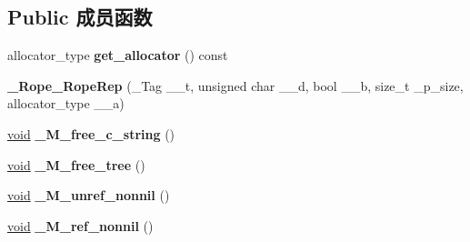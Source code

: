 \subsection*{Public 成员函数}
\begin{DoxyCompactItemize}
\item 
\mbox{\label{struct___rope___rope_rep_a7c8df0d1709c188805f4245326d29368}} 
allocator\+\_\+type {\bfseries get\+\_\+allocator} () const
\item 
\mbox{\label{struct___rope___rope_rep_a4087fed54c89f2140bf807587d797a35}} 
{\bfseries \+\_\+\+Rope\+\_\+\+Rope\+Rep} (\+\_\+\+Tag \+\_\+\+\_\+t, unsigned char \+\_\+\+\_\+d, bool \+\_\+\+\_\+b, size\+\_\+t \+\_\+p\+\_\+size, allocator\+\_\+type \+\_\+\+\_\+a)
\item 
\mbox{\label{struct___rope___rope_rep_aaf2e59bf58d52307979ca1b7da3f625a}} 
\hyperlink{interfacevoid}{void} {\bfseries \+\_\+\+M\+\_\+free\+\_\+c\+\_\+string} ()
\item 
\mbox{\label{struct___rope___rope_rep_afdfa789bd96d7f0a71ac076f7bbb027b}} 
\hyperlink{interfacevoid}{void} {\bfseries \+\_\+\+M\+\_\+free\+\_\+tree} ()
\item 
\mbox{\label{struct___rope___rope_rep_afda35226b118852a3579d2459bfbd6e5}} 
\hyperlink{interfacevoid}{void} {\bfseries \+\_\+\+M\+\_\+unref\+\_\+nonnil} ()
\item 
\mbox{\label{struct___rope___rope_rep_af198d3c0c32ead11289b7245722af297}} 
\hyperlink{interfacevoid}{void} {\bfseries \+\_\+\+M\+\_\+ref\+\_\+nonnil} ()
\end{DoxyCompactItemize}
